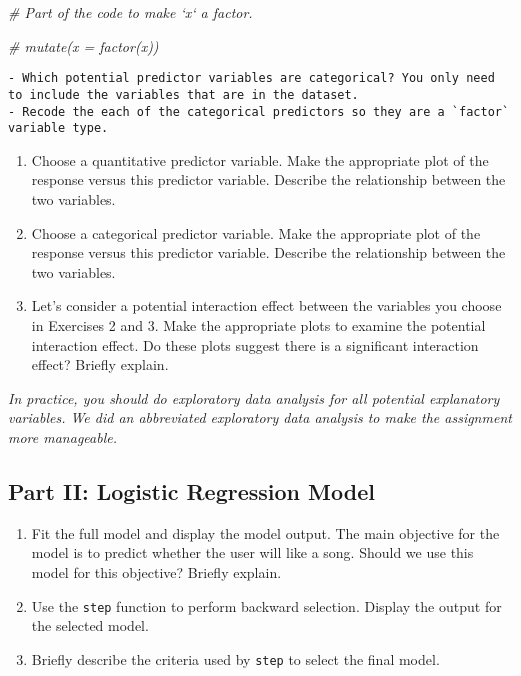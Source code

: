 \documentclass[]{book}
\newenvironment{Shaded}{\begin{snugshade}}{\end{snugshade}}
\newcommand{\CommentTok}[1]{\textcolor[rgb]{0.56,0.35,0.01}{\textit{#1}}}
\begin{document}
\begin{Shaded}
\begin{Highlighting}[]
\CommentTok{# Part of the code to make `x` a factor. }

\CommentTok{# mutate(x = factor(x))}
\end{Highlighting}
\end{Shaded}

\begin{verbatim}
- Which potential predictor variables are categorical? You only need to include the variables that are in the dataset.
- Recode the each of the categorical predictors so they are a `factor` variable type.
\end{verbatim}

\begin{enumerate}
\def\labelenumi{\arabic{enumi}.}
\setcounter{enumi}{1}
\item
  Choose a quantitative predictor variable. Make the appropriate plot of
  the response versus this predictor variable. Describe the relationship
  between the two variables.
\item
  Choose a categorical predictor variable. Make the appropriate plot of
  the response versus this predictor variable. Describe the relationship
  between the two variables.
\item
  Let's consider a potential interaction effect between the variables
  you choose in Exercises 2 and 3. Make the appropriate plots to examine
  the potential interaction effect. Do these plots suggest there is a
  significant interaction effect? Briefly explain.
\end{enumerate}

\emph{In practice, you should do exploratory data analysis for all
potential explanatory variables. We did an abbreviated exploratory data
analysis to make the assignment more manageable.}

\subsection{Part II: Logistic Regression
Model}\label{part-ii-logistic-regression-model}

\begin{enumerate}
\def\labelenumi{\arabic{enumi}.}
\setcounter{enumi}{4}
\item
  Fit the full model and display the model output. The main objective
  for the model is to predict whether the user will like a song. Should
  we use this model for this objective? Briefly explain.
\item
  Use the \texttt{step} function to perform backward selection. Display
  the output for the selected model.
\item
  Briefly describe the criteria used by \texttt{step} to select the
  final model.
\end{enumerate}
\end{document}
